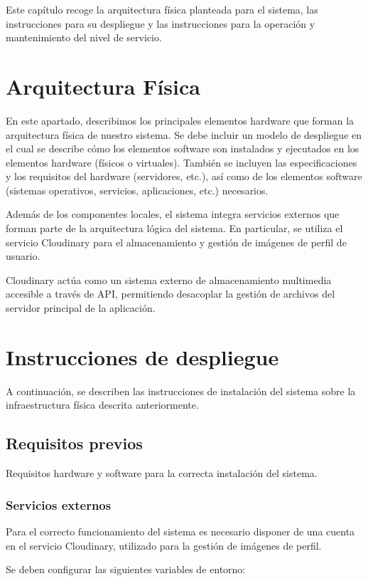 Este capítulo recoge la arquitectura física planteada para el sistema, las instrucciones para su despliegue y las instrucciones para la operación y mantenimiento del nivel de servicio.

\section{Arquitectura Física}
En este apartado, describimos los principales elementos hardware que forman la arquitectura física de nuestro sistema. Se debe incluir un modelo de despliegue en el cual se describe cómo los elementos software son instalados y ejecutados en los elementos hardware (físicos o virtuales). También se incluyen las especificaciones y los requisitos del hardware (servidores, etc.), así como de los elementos software (sistemas operativos, servicios, aplicaciones, etc.) necesarios.

Además de los componentes locales, el sistema integra servicios externos que forman parte de la arquitectura lógica del sistema. En particular, se utiliza el servicio Cloudinary para el almacenamiento y gestión de imágenes de perfil de usuario.

Cloudinary actúa como un sistema externo de almacenamiento multimedia accesible a través de API, permitiendo desacoplar la gestión de archivos del servidor principal de la aplicación.

\section{Instrucciones de despliegue}
A continuación, se describen las instrucciones de instalación del sistema sobre la infraestructura física descrita anteriormente.

\subsection{Requisitos previos}
Requisitos hardware y software para la correcta instalación del sistema.

\subsubsection{Servicios externos}

Para el correcto funcionamiento del sistema es necesario disponer de una cuenta en el servicio Cloudinary, utilizado para la gestión de imágenes de perfil.

Se deben configurar las siguientes variables de entorno:


